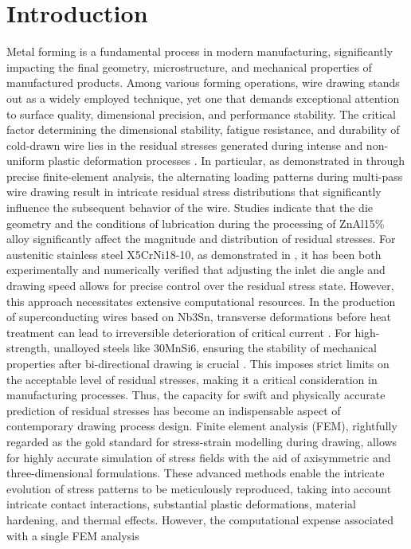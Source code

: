 \documentclass[subscriptcorrection,upint,varvw,barcolor=Goldenrod3,mathalfa=cal=euler,balance,hyphenate,french,pdf-a]{asmejour} %
\begin{document}

\section{Introduction}

Metal forming is a fundamental process in modern manufacturing, significantly impacting the final geometry, microstructure, and mechanical properties of manufactured products. Among various forming operations, wire drawing stands out as a widely employed technique, yet one that demands exceptional attention to surface quality, dimensional precision, and performance stability.
The critical factor determining the dimensional stability, fatigue resistance, and durability of cold-drawn wire lies in the residual stresses generated during intense and non-uniform plastic deformation processes \citep{burioli2024novel,lim2026study,shin2026accurate,delrey2025effect,delrey2026advances,he2003residual,overstam2006influence,aghdami2020inverse,radionova2022fem, selbmann2024residual, suliga2024influence, ruminski2025effect}. In particular, as demonstrated in \citep{shin2026accurate} through precise finite-element analysis, the alternating loading patterns during multi-pass wire drawing result in intricate residual stress distributions that significantly influence the subsequent behavior of the wire. Studies \citep{delrey2025effect, delrey2026advances} indicate that the die geometry and the conditions of lubrication during the processing of ZnAl15\% alloy significantly affect the magnitude and distribution of residual stresses. For austenitic stainless steel X5CrNi18-10, as demonstrated in \citep{selbmann2024residual}, it has been both experimentally and numerically verified that adjusting the inlet die angle and drawing speed allows for precise control over the residual stress state. However, this approach necessitates extensive computational resources. In the production of superconducting wires based on Nb3Sn, transverse deformations before heat treatment can lead to irreversible deterioration of critical current \citep{burioli2024novel}. For high-strength, unalloyed steels like 30MnSi6, ensuring the stability of mechanical properties after bi-directional drawing is crucial \citep{lim2026study}. This imposes strict limits on the acceptable level of residual stresses, making it a critical consideration in manufacturing processes. Thus, the capacity for swift and physically accurate prediction of residual stresses has become an indispensable aspect of contemporary drawing process design. Finite element analysis (FEM), rightfully regarded as the gold standard for stress-strain modelling during drawing, allows for highly accurate simulation of stress fields with the aid of axisymmetric and three-dimensional formulations. These advanced methods enable the intricate evolution of stress patterns to be meticulously reproduced, taking into account intricate contact interactions, substantial plastic deformations, material hardening, and thermal effects. However, the computational expense associated with a single FEM analysis 
\end{document}
